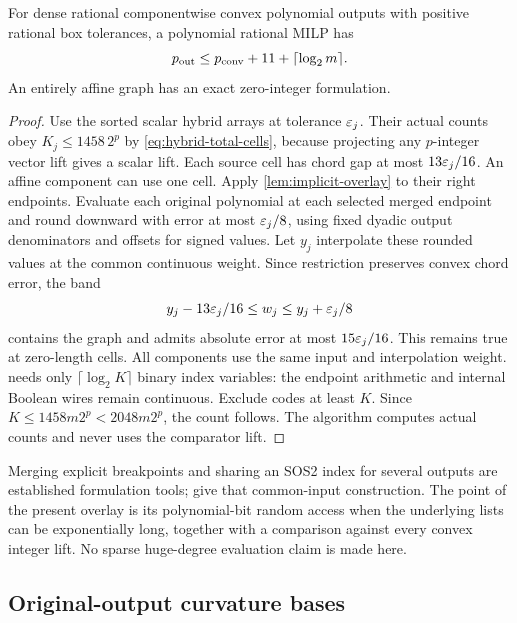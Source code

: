 \begin{theorem}\label{thm:convex-vector-overlay}
For dense rational componentwise convex polynomial outputs with positive
rational box tolerances, a polynomial rational MILP has
\[
 p_{\mathrm{out}}\le p_{\mathrm{conv}}+11+\lceil\log_2m\rceil.
\]
An entirely affine graph has an exact zero-integer formulation.
\end{theorem}
\begin{proof}
Use the sorted scalar hybrid arrays at tolerance $\varepsilon_j$. Their actual
counts obey $K_j\le1458\,2^p$ by \eqref{eq:hybrid-total-cells}, because
projecting any $p$-integer vector lift gives a scalar lift. Each source
cell has chord gap at most $13\varepsilon_j/16$. An affine component can use
one cell. Apply \cref{lem:implicit-overlay} to their right endpoints.
Evaluate each original polynomial at each selected merged endpoint
and round downward with error at most $\varepsilon_j/8$, using fixed dyadic
output denominators and offsets for signed values. Let $y_j$ interpolate
these rounded values at the common continuous weight. Since restriction
preserves convex chord error, the band
\begin{equation}\label{eq:vector-directed-band}
 y_j-13\varepsilon_j/16\le w_j\le y_j+\varepsilon_j/8
\end{equation}
contains the graph and admits absolute error at most $15\varepsilon_j/16$.
This remains true at zero-length cells. All components use the same
input and interpolation weight.  needs
only $\lceil\log_2K\rceil$ binary index variables: the endpoint
arithmetic and internal Boolean wires remain continuous. Exclude codes
at least $K$. Since $K\le1458m2^p<2048m2^p$, the count follows.
The algorithm computes actual counts and never uses the comparator lift.
\end{proof}

Merging explicit breakpoints and sharing an SOS2 index for several outputs
are established formulation tools; \citet[Section 3, Proposition 1]{lyu2026}
give that common-input construction. The point of the present overlay is
its polynomial-bit random access when the underlying lists can be
exponentially long, together with a comparison against every convex
integer lift. No sparse huge-degree evaluation claim is made here.

\subsection{Original-output curvature bases}

